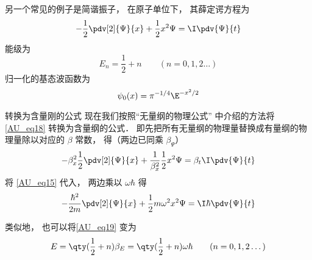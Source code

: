 另一个常见的例子是简谐振子， 在原子单位下， 其薛定谔方程为
\begin{equation}\label{AU_eq18}
-\frac12 \pdv[2]{\Psi}{x} + \frac12 x^2 \Psi= \I\pdv{\Psi}{t}
\end{equation}
能级为
\begin{equation}\label{AU_eq19}
E_n = \frac12 + n \qquad (n = 0, 1, 2\dots)
\end{equation}
归一化的基态波函数为
\begin{equation}
\psi_0(x) = \pi^{-1/4} \E^{-x^2/2}
\end{equation}


\begin{example}{转换为含量刚的公式}
现在我们按照“无量纲的物理公式” 中介绍的方法将\autoref{AU_eq18} 转换为含量纲的公式． 即先把所有无量纲的物理量替换成有量纲的物理量除以对应的 $\beta$ 常数， 得（两边已同乘 $\beta_\Psi$）
\begin{equation}
-\beta_x^2\frac12 \pdv[2]{\Psi}{x} + \frac{1}{\beta_x^2}\frac12 x^2 \Psi= \beta_t\I\pdv{\Psi}{t}
\end{equation}
将 \autoref{AU_eq15} 代入， 两边乘以 $\omega\hbar$ 得
\begin{equation}
-\frac{\hbar^2}{2m} \pdv[2]{\Psi}{x} + \frac12 m\omega^2 x^2 \Psi= \I\hbar\pdv{\Psi}{t}
\end{equation}

类似地， 也可以将\autoref{AU_eq19} 变为
\begin{equation}
E =  \qty(\frac12 + n)\beta_E = \qty(\frac12 + n)\omega\hbar \qquad (n = 0, 1, 2\dots)
\end{equation}
\end{example}
